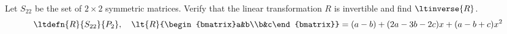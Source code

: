 Let $S_{22}$ be the set of $2\times 2$ symmetric matrices.  Verify that the linear transformation $R$ is invertible and find $\ltinverse{R}$.
%
\begin{equation*}
\ltdefn{R}{S_{22}}{P_2},\quad\lt{R}{\begin{bmatrix}a&b\\b&c\end{bmatrix}}=
(a-b)+(2a-3b-2c)x+(a-b+c)x^2
\end{equation*}